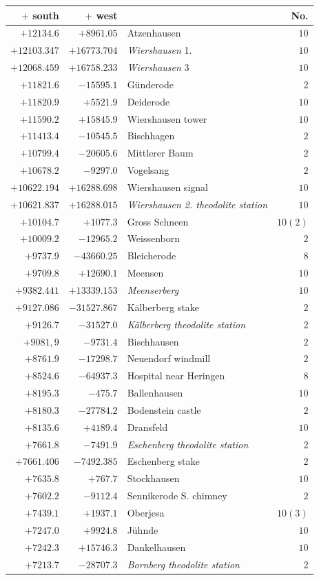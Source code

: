 \begin{center}\begingroup\fontsize{8}{9}\selectfont
\setlength{\tabcolsep}{4pt}
\begin{tabular}{r|r|p{170pt}|r}\hline
\(+\) south&\(+\) west&&No.\\\hline
\(+12134.6\)&\(+8961.05\)&Atzenhausen&\(10\)\\
\(+12103.347\)&\(+16773.704\)&\textit{Wiershausen} 1.&\(10\)\\
\(+12068.459\)&\(+16758.233\)&\textit{Wiershausen} 3&\(10\)\\
\(+11821.6\)&\(-15595.1\)&Günderode&\(2\)\\
\(+11820.9\)&\(+5521.9\)&Deiderode&\(10\)\\
\(+11590.2\)&\(+15845.9\)&Wiershausen tower&\(10\)\\
\(+11413.4\)&\(-10545.5\)&Bischhagen&\(2\)\\
\(+10799.4\)&\(-20605.6\)&Mittlerer Baum&\(2\)\\
\(+10678.2\)&\(-9297.0\)&Vogelsang&\(2\)\\
\(+10622.194\)&\(+16288.698\)&Wiershausen signal&\(10\)\\
\(+10621.837\)&\(+16288.015\)&\textit{Wiershausen 2. theodolite station}&\(10\)\\
\(+10104.7\)&\(+1077.3\)&Gross Schneen&\(10(2)\)\\
\(+10009.2\)&\(-12965.2\)&Weissenborn&\(2\)\\
\(+9737.9\)&\(-43660.25\)&Bleicherode&\(8\)\\
\(+9709.8\)&\(+12690.1\)&Meensen&\(10\)\\
\(+9382.441\)&\(+13339.153\)&\textit{Meenserberg}&\(10\)\\
\(+9127.086\)&\(-31527.867\)&Kälberberg stake&\(2\)\\
\(+9126.7\)&\(-31527.0\)&\textit{Kälberberg theodolite station}&\(2\)\\
\(+9081{,}9\)&\(-9731.4\)&Bischhausen&\(2\)\\
\(+8761.9\)&\(-17298.7\)&Neuendorf windmill&\(2\)\\
\(+8524.6\)&\(-64937.3\)&Hospital near Heringen&\(8\)\\
\(+8195.3\)&\(-475.7\)&Ballenhausen&\(10\)\\
\(+8180.3\)&\(-27784.2\)&Bodenstein castle&\(2\)\\
\(+8135.6\)&\(+4189.4\)&Dransfeld&\(10\)\\
\(+7661.8\)&\(-7491.9\)&\textit{Eschenberg theodolite station}&\(2\)\\
\(+7661.406\)&\(-7492.385\)&Eschenberg stake&\(2\)\\
\(+7635.8\)&\(+767.7\)&Stockhausen&\(10\)\\
\(+7602.2\)&\(-9112.4\)&Sennikerode S. chimney&\(2\)\\
\(+7439.1\)&\(+1937.1\)&Oberjesa&\(10(3)\)\\
\(+7247.0\)&\(+9924.8\)&Jühnde&\(10\)\\
\(+7242.3\)&\(+15746.3\)&Dankelhausen&\(10\)\\
\(+7213.7\)&\(-28707.3\)&\textit{Bornberg theodolite station}&\(2\)\\
\hline\end{tabular}\endgroup\end{center}
